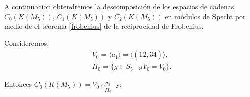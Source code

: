 \documentclass[12pt]{book}
\theoremstyle{definition}
\newcounter{in}
\begin{document}
A continuación obtendremos la descomposición de los espacios de
cadenas $C_{0}(K(M_{5}))$, $C_{1}(K(M_{5}))$ y $C_{2}(K(M_{5}))$ en
módulos de Specht por medio de el teorema \ref{frobenius} de la reciprocidad de Frobenius.

Consideremos:
\begin{eqnarray*}
V_{0}=\langle a_{1}\rangle=\langle
(\overline{12},\overline{34})\rangle,\\
H_{0}=\{g\in S_{5}\mid gV_{0}=V_{0}\}.
\end{eqnarray*}

Entonces $C_{0}(K(M_{5}))=V_{0}\uparrow^{S_{5}}_{H_0}$ y:

  \begin{table}[!hbtp]
    \centering
    
    \caption{Caracteres de $S_{5}$ restringidos a $H_{0}$ y carácter de $V_{0}$}
    \label{tab:clanes-H_0-5}
  \end{table}
\end{document}
